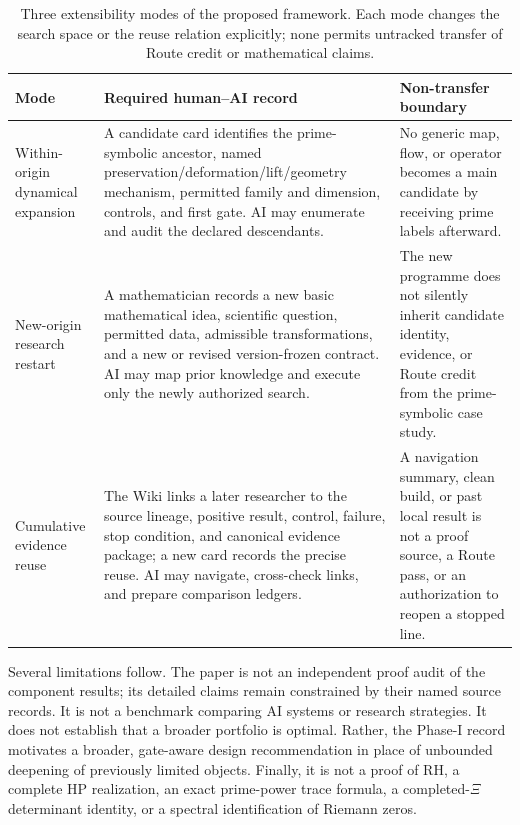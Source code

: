 \begin{table}[H]
\centering
\caption{Three extensibility modes of the proposed framework. Each mode
changes the search space or the reuse relation explicitly; none permits
untracked transfer of Route credit or mathematical claims.}
\label{tab:extensibility}
\small
\renewcommand{\arraystretch}{1.08}
\begin{tabularx}{\linewidth}{@{}p{.22\linewidth}Yp{.25\linewidth}@{}}
\toprule
\textbf{Mode} & \textbf{Required human--AI record} & \textbf{Non-transfer boundary} \\
\midrule
Within-origin dynamical expansion & A candidate card identifies the
prime-symbolic ancestor, named preservation/deformation/lift/geometry
mechanism, permitted family and dimension, controls, and first gate. AI may
enumerate and audit the declared descendants. & No generic map, flow, or
operator becomes a main candidate by receiving prime labels afterward. \\
New-origin research restart & A mathematician records a new basic
mathematical idea, scientific question, permitted data, admissible
transformations, and a new or revised version-frozen contract. AI may map
prior knowledge and execute only the newly authorized search. & The new
programme does not silently inherit candidate identity, evidence, or Route
credit from the prime-symbolic case study. \\
Cumulative evidence reuse & The Wiki links a later researcher to the source
lineage, positive result, control, failure, stop condition, and canonical
evidence package; a new card records the precise reuse. AI may navigate,
cross-check links, and prepare comparison ledgers. & A navigation summary,
clean build, or past local result is not a proof source, a Route pass, or an
authorization to reopen a stopped line. \\
\bottomrule
\end{tabularx}
\end{table}

Several limitations follow. The paper is not an independent proof audit of the
component results; its detailed claims remain constrained by their named source
records. It is not a benchmark comparing AI systems or research strategies. It
does not establish that a broader portfolio is optimal. Rather, the Phase-I
record motivates a broader, gate-aware design recommendation in place of
unbounded deepening of previously limited objects. Finally, it is not a proof
of RH, a complete HP realization, an exact prime-power trace formula, a
completed-\(\Xi\) determinant identity, or a spectral identification of
Riemann zeros.

